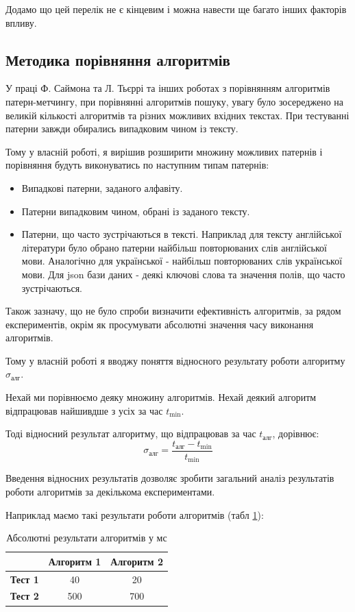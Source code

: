 \documentclass[a4paper,14pt]{extarticle} %
\begin{document}
	Додамо що цей перелік не є кінцевим і можна навести ще багато інших факторів впливу.

	\subsection{Методика порівняння алгоритмів}\label{methodic}

	У праці Ф. Саймона та Л. Тьєррі \cite{experiment} та інших роботах з порівнянням алгоритмів патерн-метчингу, при порівнянні алгоритмів пошуку, увагу було зосереджено на великій кількості алгоритмів та різних можливих вхідних текстах.
	При тестуванні патерни завжди обирались випадковим чином із тексту.

	Тому у власній роботі, я вирішив розширити множину можливих патернів і порівняння будуть виконуватись по наступним типам патернів:
	\begin{itemize}
		\item Випадкові патерни, заданого алфавіту.
		\item Патерни випадковим чином, обрані із заданого тексту.
		\item Патерни, що часто зустрічаються в тексті. Наприклад для тексту англійської літератури було обрано патерни найбільш повторюваних слів англійської мови. Аналогічно для української - найбільш повторюваних слів української мови. Для json бази даних - деякі ключові слова та значення полів, що часто зустрічаються.
	\end {itemize}

	Також зазначу, що не було спроби визначити ефективність алгоритмів, за рядом експериментів, окрім як просумувати абсолютні значення часу виконання алгоритмів.

	Тому у власній роботі я вводжу поняття відносного результату роботи алгоритму $\sigma_{\text{алг}}$.

	Нехай ми порівнюємо деяку множину алгоритмів. Нехай деякий алгоритм відпрацював найшивдше з усіх за час $t_{\text{min}}$.

	Тоді відносний результат алгоритму, що відпрацював за час $t_{\text{алг}}$, дорівнює:
	$$\sigma_{\text{алг}} = \frac{t_{\text{алг}}-t_{\text{min}}}{t_{\text{min}}}$$
    
	Введення відносних результатів дозволяє зробити загальний аналіз результатів роботи алгоритмів за декількома експериментами.

	Наприклад маємо такі результати роботи алгоритмів (табл \ref{table:times}):
	\begin{table}[H]
		\centering
		\begin{tabular}{|c|c|c|}
			\hline
			& \textbf{Алгоритм 1} & \textbf{Алгоритм 2} \\ 
			\hline
			\textbf{Тест 1} & 40 & 20 \\ 
			\hline
			\textbf{Тест 2} & 500 & 700 \\ 
			\hline
		\end{tabular}
		\caption{Абсолютні результати алгоритмів у мс}
		\label{table:times}
	\end{table}
\end{document}
